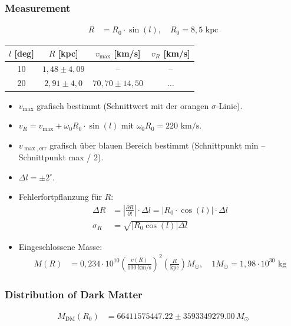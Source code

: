 \subsubsection*{Measurement}
\begin{align}
R &= R_{0}\cdot \sin(l), \quad R_{0} = 8,5\text{ kpc}
\end{align}

\begin{table}[htbp]
\centering
\begin{tabular}{cccc}
\toprule
$l$ [deg] & $R$ [kpc] & $v_{\max}$ [km/s] & $v_{R}$ [km/s] \\
\midrule
10 & $1,48 \pm 4,09$ & -- & -- \\
20 & $2,91 \pm 4,0$ & $70,70 \pm 14,50$ & $\dots$ \\
\bottomrule
\end{tabular}
\end{table}

\begin{itemize}
    \item $v_{\max}$ grafisch bestimmt (Schnittwert mit der orangen $\sigma$-Linie).
    \item $v_{R} = v_{\max} + \omega_{0}R_{0}\cdot \sin(l)$ mit $\omega_{0}R_{0} = 220\text{ km/s}$.
    \item $v_{\max,\text{err}}$ grafisch über blauen Bereich bestimmt (Schnittpunkt min -- Schnittpunkt max / 2).
    \item $\Delta l = \pm 2^\circ$.
    \item Fehlerfortpflanzung für $R$:
    \begin{align}
    \Delta R &= \left|\frac{\partial R}{\partial l}\right|\cdot \Delta l = |R_{0}\cdot \cos(l)|\cdot \Delta l \\
    \sigma_{R} &= \sqrt{|R_{0}\cos(l)|\Delta l}
    \end{align}
    \item Eingeschlossene Masse:
    \begin{align}
    M(R) &= 0,234 \cdot 10^{10} \left( \frac{v(R)}{100\text{ km/s}} \right)^2 \left( \frac{R}{\text{kpc}} \right) M_{\odot}, \quad 1 M_{\odot} = 1,98 \cdot 10^{30}\text{ kg}
    \end{align}
\end{itemize}

\subsubsection*{Distribution of Dark Matter}
\begin{align}
M_{\text{DM}}(R_0) &= 66411575447.22 \pm 3593349279.00 \, M_{\odot}
\end{align}